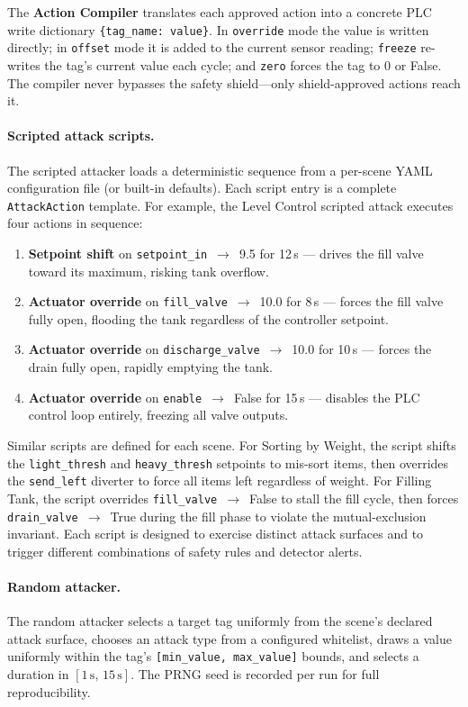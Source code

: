The \textbf{Action Compiler} translates each approved action into a concrete PLC write dictionary \texttt{\{tag\_name: value\}}. In \texttt{override} mode the value is written directly; in \texttt{offset} mode it is added to the current sensor reading; \texttt{freeze} re-writes the tag's current value each cycle; and \texttt{zero} forces the tag to 0 or False. The compiler never bypasses the safety shield---only shield-approved actions reach it.

\paragraph{Scripted attack scripts.}
The scripted attacker loads a deterministic sequence from a per-scene YAML configuration file (or built-in defaults). Each script entry is a complete \texttt{AttackAction} template. For example, the Level Control scripted attack executes four actions in sequence:
\begin{enumerate}[leftmargin=1.5em, nosep]
  \item \textbf{Setpoint shift} on \texttt{setpoint\_in}~$\to$~9.5 for 12\,s --- drives the fill valve toward its maximum, risking tank overflow.
  \item \textbf{Actuator override} on \texttt{fill\_valve}~$\to$~10.0 for 8\,s --- forces the fill valve fully open, flooding the tank regardless of the controller setpoint.
  \item \textbf{Actuator override} on \texttt{discharge\_valve}~$\to$~10.0 for 10\,s --- forces the drain fully open, rapidly emptying the tank.
  \item \textbf{Actuator override} on \texttt{enable}~$\to$~False for 15\,s --- disables the PLC control loop entirely, freezing all valve outputs.
\end{enumerate}
Similar scripts are defined for each scene. For Sorting by Weight, the script shifts the \texttt{light\_thresh} and \texttt{heavy\_thresh} setpoints to mis-sort items, then overrides the \texttt{send\_left} diverter to force all items left regardless of weight. For Filling Tank, the script overrides \texttt{fill\_valve}~$\to$~False to stall the fill cycle, then forces \texttt{drain\_valve}~$\to$~True during the fill phase to violate the mutual-exclusion invariant. Each script is designed to exercise distinct attack surfaces and to trigger different combinations of safety rules and detector alerts.

\paragraph{Random attacker.}
The random attacker selects a target tag uniformly from the scene's declared attack surface, chooses an attack type from a configured whitelist, draws a value uniformly within the tag's \texttt{[min\_value, max\_value]} bounds, and selects a duration in $[1\,\text{s},\,15\,\text{s}]$. The PRNG seed is recorded per run for full reproducibility.

